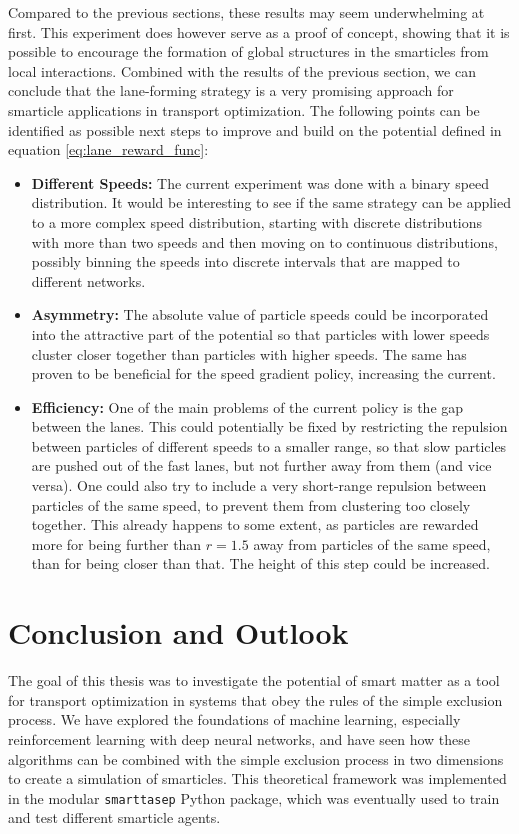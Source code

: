 Compared to the previous sections, these results may seem underwhelming at first. This experiment does however serve as a proof of concept, showing that it is possible to encourage the formation of global structures in the smarticles from local interactions. Combined with the results of the previous section, we can conclude that the lane-forming strategy is a very promising approach for smarticle applications in transport optimization. The following points can be identified as possible next steps to improve and build on the potential defined in equation \ref{eq:lane_reward_func}:
\begin{itemize}
    \item \textbf{Different Speeds:} The current experiment was done with a binary speed distribution. It would be interesting to see if the same strategy can be applied to a more complex speed distribution, starting with discrete distributions with more than two speeds and then moving on to continuous distributions, possibly binning the speeds into discrete intervals that are mapped to different networks. 
    \item \textbf{Asymmetry:} The absolute value of particle speeds could be incorporated into the attractive part of the potential so that particles with lower speeds cluster closer together than particles with higher speeds. The same has proven to be beneficial for the speed gradient policy, increasing the current.
    \item \textbf{Efficiency:} One of the main problems of the current policy is the gap between the lanes. This could potentially be fixed by restricting the repulsion between particles of different speeds to a smaller range, so that slow particles are pushed out of the fast lanes, but not further away from them (and vice versa). One could also try to include a very short-range repulsion between particles of the same speed, to prevent them from clustering too closely together. This already happens to some extent, as particles are rewarded more for being further than $r=1.5$ away from particles of the same speed, than for being closer than that. The height of this step could be increased. 
\end{itemize}

\chapter{Conclusion and Outlook}
\label{chap:conclusion}
The goal of this thesis was to investigate the potential of smart matter as a tool for transport optimization in systems that obey the rules of the simple exclusion process. We have explored the foundations of machine learning, especially reinforcement learning with deep neural networks, and have seen how these algorithms can be combined with the simple exclusion process in two dimensions to create a simulation of smarticles. This theoretical framework was implemented in the modular \texttt{smarttasep} Python package, which was eventually used to train and test different smarticle agents.


